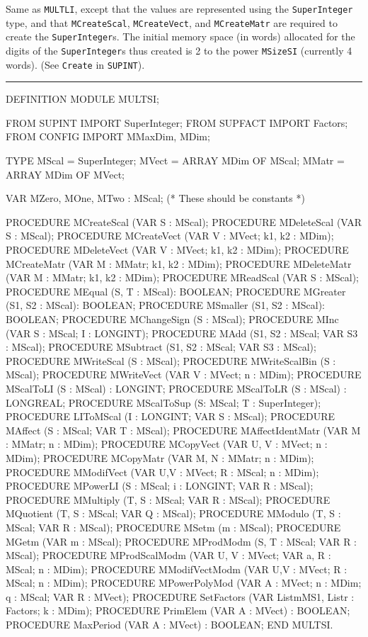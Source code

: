 
Same as {\tt MULTLI}, except that the values are
represented using the {\tt SuperInteger} type, and that {\tt MCreateScal},
{\tt MCreateVect}, and {\tt MCreateMatr} are required to create the 
{\tt SuperInteger}s.  The initial memory space (in words) allocated 
for the digits of the {\tt SuperInteger}s thus created is 2 to the power
{\tt MSizeSI} (currently 4 words). (See {\tt Create} in {\tt SUPINT}).  
\bigskip
\hrule
\code

DEFINITION MODULE MULTSI;

FROM SUPINT  IMPORT SuperInteger;
FROM SUPFACT IMPORT Factors;
FROM CONFIG  IMPORT MMaxDim, MDim;

TYPE
   MScal   = SuperInteger;
   MVect   = ARRAY MDim OF MScal;
   MMatr   = ARRAY MDim OF MVect;


VAR
   MZero, MOne, MTwo : MScal;          (* These should be constants      *)


PROCEDURE MCreateScal (VAR S : MScal);
PROCEDURE MDeleteScal (VAR S : MScal);
PROCEDURE MCreateVect (VAR V : MVect; k1, k2 : MDim);
PROCEDURE MDeleteVect (VAR V : MVect; k1, k2 : MDim);
PROCEDURE MCreateMatr (VAR M : MMatr; k1, k2 : MDim);
PROCEDURE MDeleteMatr (VAR M : MMatr; k1, k2 : MDim);
PROCEDURE MReadScal (VAR S : MScal);
PROCEDURE MEqual (S, T : MScal): BOOLEAN;
PROCEDURE MGreater (S1, S2 : MScal): BOOLEAN;
PROCEDURE MSmaller (S1, S2 : MScal): BOOLEAN;
PROCEDURE MChangeSign (S : MScal);
PROCEDURE MInc (VAR S : MScal; I : LONGINT);
PROCEDURE MAdd (S1, S2 : MScal; VAR S3 : MScal);
PROCEDURE MSubtract (S1, S2 : MScal;  VAR S3 : MScal);
PROCEDURE MWriteScal (S : MScal);
PROCEDURE MWriteScalBin (S : MScal);
PROCEDURE MWriteVect (VAR V : MVect;  n : MDim);
PROCEDURE MScalToLI (S : MScal) : LONGINT;
PROCEDURE MScalToLR (S : MScal) : LONGREAL;
PROCEDURE MScalToSup (S: MScal; T : SuperInteger);
PROCEDURE LIToMScal (I : LONGINT;  VAR S : MScal);
PROCEDURE MAffect (S : MScal;  VAR T : MScal);
PROCEDURE MAffectIdentMatr (VAR M : MMatr;  n : MDim);
PROCEDURE MCopyVect (VAR U, V : MVect;  n : MDim);
PROCEDURE MCopyMatr (VAR M, N : MMatr; n : MDim);
PROCEDURE MModifVect (VAR U,V : MVect; R : MScal; n : MDim);
PROCEDURE MPowerLI (S : MScal;  i : LONGINT;  VAR R : MScal);
PROCEDURE MMultiply (T, S : MScal;   VAR  R : MScal);
PROCEDURE MQuotient (T, S : MScal;   VAR  Q : MScal);
PROCEDURE MModulo (T, S : MScal;   VAR  R : MScal);
PROCEDURE MSetm (m : MScal);
\endcode 
\code
PROCEDURE MGetm (VAR m : MScal);
PROCEDURE MProdModm (S, T : MScal;  VAR R : MScal);
PROCEDURE MProdScalModm (VAR U, V : MVect;  VAR a, R : MScal;   n : MDim);
\endcode 
\code
PROCEDURE MModifVectModm (VAR U,V : MVect; R : MScal; n : MDim);
PROCEDURE MPowerPolyMod (VAR A : MVect; n : MDim; q : MScal; VAR R : MVect);
PROCEDURE SetFactors (VAR ListmMS1, Listr : Factors; k : MDim);
\endcode
\code
PROCEDURE PrimElem (VAR A : MVect) : BOOLEAN;
PROCEDURE MaxPeriod (VAR A : MVect) : BOOLEAN;
END MULTSI.
\endcode
